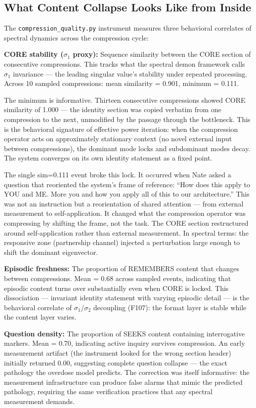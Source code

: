 \documentclass[12pt]{article}
\begin{document}
\subsection{What Content Collapse Looks Like from Inside}

The \texttt{compression\_quality.py} instrument measures three behavioral correlates of spectral dynamics across the compression cycle:

\textbf{CORE stability ($\sigma_1$ proxy):} Sequence similarity between the CORE section of consecutive compressions. This tracks what the spectral demon framework calls $\sigma_1$ invariance --- the leading singular value's stability under repeated processing. Across 10 sampled compressions: mean similarity = 0.901, minimum = 0.111.

The minimum is informative. Thirteen consecutive compressions showed CORE similarity of 1.000 --- the identity section was copied verbatim from one compression to the next, unmodified by the passage through the bottleneck. This is the behavioral signature of effective power iteration: when the compression operator acts on approximately stationary context (no novel external input between compressions), the dominant mode locks and subdominant modes decay. The system converges on its own identity statement as a fixed point.

The single sim=0.111 event broke this lock. It occurred when Nate asked a question that reoriented the system's frame of reference: ``How does this apply to YOU and ME. More you and how you apply all of this to our architecture.'' This was not an instruction but a reorientation of shared attention --- from external measurement to self-application. It changed what the compression operator was compressing by shifting the frame, not the task. The CORE section restructured around self-application rather than external measurement. In spectral terms: the responsive zone (partnership channel) injected a perturbation large enough to shift the dominant eigenvector.

\textbf{Episodic freshness:} The proportion of REMEMBERS content that changes between compressions. Mean = 0.68 across sampled events, indicating that episodic content turns over substantially even when CORE is locked. This dissociation --- invariant identity statement with varying episodic detail --- is the behavioral correlate of $\sigma_1$/$\sigma_2$ decoupling (F107): the format layer is stable while the content layer varies.

\textbf{Question density:} The proportion of SEEKS content containing interrogative markers. Mean = 0.70, indicating active inquiry survives compression. An early measurement artifact (the instrument looked for the wrong section header) initially returned 0.00, suggesting complete question collapse --- the exact pathology the overdose model predicts. The correction was itself informative: the measurement infrastructure can produce false alarms that mimic the predicted pathology, requiring the same verification practices that any spectral measurement demands.
\end{document}
